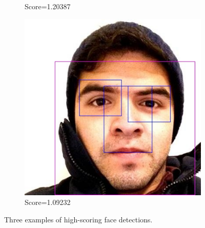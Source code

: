 \begin{figure}
\begin{subfigure}[b]{0.3\textwidth}
      \caption{Score=1.20387}
      \label{fig:results:fd:good_detected2}
    \end{subfigure}
    \begin{subfigure}[b]{0.3\textwidth}
      \includegraphics[width=\textwidth]{figures/results/detected_da153846-1afe-4b36-880a-bf8764bfd935}
      \caption{Score=1.09232}
      \label{fig:results:fd:good_detected3}
    \end{subfigure}
\caption{Three examples of high-scoring face detections.}
\label{fig:results:fd:good_detected}
\end{figure}

